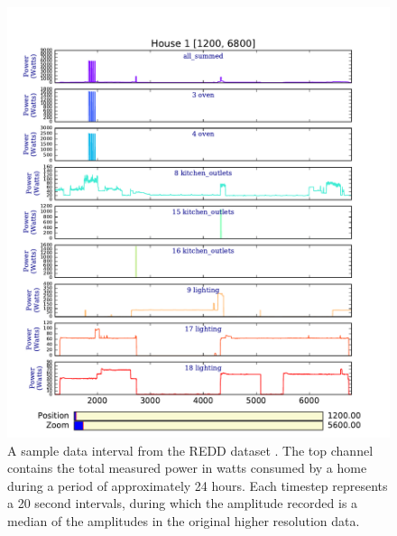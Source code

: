 \begin{figure}[tb]
  \centering
  \includegraphics[width=\textwidth]{data/REDD/jw2013_downsampled_intervals/house_1_1200_6800/house_1_1200-6800.pdf}
  \caption{A sample data interval from the REDD dataset \cite{kolter2011redd}.  The top channel contains the total measured power in watts consumed by a home during a period of approximately 24 hours.  Each timestep represents a 20 second intervals, during which the amplitude recorded is a median of the amplitudes in the original higher resolution data.}
  \label{fig:redd-data-example}
\end{figure}
